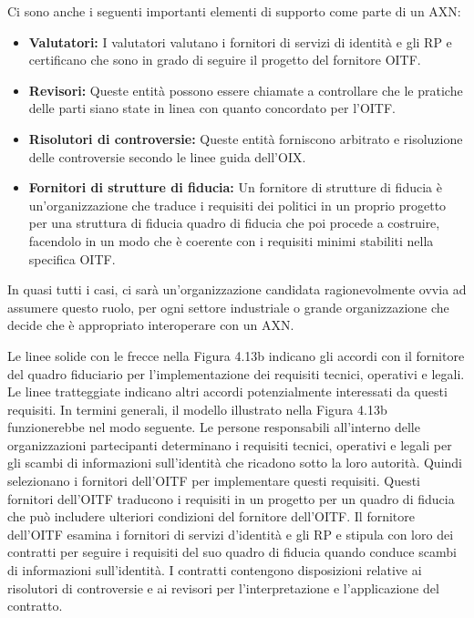 Ci sono anche i seguenti importanti elementi di supporto come parte di un AXN:
\begin{itemize}
    \item \textbf{Valutatori:} I valutatori valutano i fornitori di servizi di identità e gli RP e certificano che sono in grado di seguire il progetto del fornitore OITF.
    
    \item \textbf{Revisori:} Queste entità possono essere chiamate a controllare che le pratiche delle parti siano state in linea con quanto concordato per l'OITF.
    
    \item \textbf{Risolutori di controversie:} Queste entità forniscono arbitrato e risoluzione delle controversie secondo le linee guida dell'OIX.
    
    \item \textbf{Fornitori di strutture di fiducia:} Un fornitore di strutture di fiducia è un'organizzazione che traduce i requisiti dei politici in un proprio progetto per una struttura di fiducia quadro di fiducia che poi procede a costruire, facendolo in un modo che è coerente con i requisiti minimi stabiliti nella specifica OITF.
\end{itemize}

In quasi tutti i casi, ci sarà un'organizzazione candidata ragionevolmente ovvia ad assumere questo ruolo, per ogni settore industriale o grande organizzazione che decide che è appropriato interoperare con un AXN.

\singlespacing

Le linee solide con le frecce nella Figura 4.13b indicano gli accordi con il fornitore del quadro fiduciario per l'implementazione dei requisiti tecnici, operativi e legali. Le linee tratteggiate indicano altri accordi potenzialmente interessati da questi requisiti. In termini generali, il modello illustrato nella Figura 4.13b funzionerebbe nel modo seguente. Le persone responsabili all'interno delle organizzazioni partecipanti determinano i requisiti tecnici, operativi e legali per gli scambi di informazioni sull'identità che ricadono sotto la loro autorità. Quindi selezionano i fornitori dell'OITF per implementare questi requisiti. Questi fornitori dell'OITF traducono i requisiti in un progetto per un quadro di fiducia che può includere ulteriori condizioni del fornitore dell'OITF. Il fornitore dell'OITF esamina i fornitori di servizi d'identità e gli RP e stipula con loro dei contratti per seguire i requisiti del suo quadro di fiducia quando conduce scambi di informazioni sull'identità. I contratti contengono disposizioni relative ai risolutori di controversie e ai revisori per l'interpretazione e l'applicazione del contratto.

